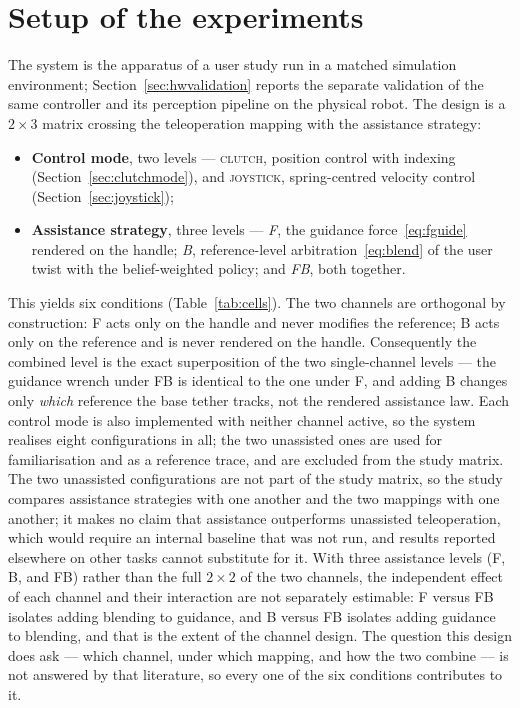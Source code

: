 \documentclass[12pt,a4paper,twoside,openright]{report}
\begin{document}
\section{Setup of the experiments}
\label{sec:study}

The system is the apparatus of a user study run in a matched simulation environment; Section~\ref{sec:hwvalidation} reports the separate validation of the same controller and its perception pipeline on the physical robot. The design is a $2\times3$ matrix crossing the teleoperation mapping with the assistance strategy:
\begin{itemize}[nosep]
\item \textbf{Control mode}, two levels --- \textsc{clutch}, position control with indexing (Section~\ref{sec:clutchmode}), and \textsc{joystick}, spring-centred velocity control (Section~\ref{sec:joystick});
\item \textbf{Assistance strategy}, three levels --- \emph{F}, the guidance force~\eqref{eq:fguide} rendered on the handle; \emph{B}, reference-level arbitration~\eqref{eq:blend} of the user twist with the belief-weighted policy; and \emph{FB}, both together.
\end{itemize}
This yields six conditions (Table~\ref{tab:cells}). The two channels are orthogonal by construction: F acts only on the handle and never modifies the reference; B acts only on the reference and is never rendered on the handle. Consequently the combined level is the exact superposition of the two single-channel levels --- the guidance wrench under FB is identical to the one under F, and adding B changes only \emph{which} reference the base tether tracks, not the rendered assistance law. Each control mode is also implemented with neither channel active, so the system realises eight configurations in all; the two unassisted ones are used for familiarisation and as a reference trace, and are excluded from the study matrix. The two unassisted configurations are not part of the study matrix, so the study compares assistance strategies with one another and the two mappings with one another; it makes no claim that assistance outperforms unassisted teleoperation, which would require an internal baseline that was not run, and results reported elsewhere on other tasks cannot substitute for it. With three assistance levels (F, B, and FB) rather than the full $2\times2$ of the two channels, the independent effect of each channel and their interaction are not separately estimable: F versus FB isolates adding blending to guidance, and B versus FB isolates adding guidance to blending, and that is the extent of the channel design. The question this design does ask --- which channel, under which mapping, and how the two combine --- is not answered by that literature, so every one of the six conditions contributes to it.
\end{document}
